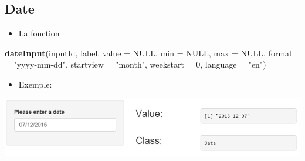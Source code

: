 \documentclass[
]{article}
\newenvironment{Shaded}{\begin{snugshade}}{\end{snugshade}}
\newcommand{\AttributeTok}[1]{\textcolor[rgb]{0.13,0.29,0.53}{#1}}
\newcommand{\CommentTok}[1]{\textcolor[rgb]{0.56,0.35,0.01}{\textit{#1}}}
\newcommand{\ConstantTok}[1]{\textcolor[rgb]{0.56,0.35,0.01}{#1}}
\newcommand{\DecValTok}[1]{\textcolor[rgb]{0.00,0.00,0.81}{#1}}
\newcommand{\FunctionTok}[1]{\textcolor[rgb]{0.13,0.29,0.53}{\textbf{#1}}}
\newcommand{\NormalTok}[1]{#1}
\newcommand{\StringTok}[1]{\textcolor[rgb]{0.31,0.60,0.02}{#1}}
\providecommand{\tightlist}{%
  \setlength{\itemsep}{0pt}\setlength{\parskip}{0pt}}
\begin{document}
\hypertarget{date}{%
\subsection{Date}\label{date}}

\begin{itemize}
\tightlist
\item
  La fonction
\end{itemize}

\begin{Shaded}
\begin{Highlighting}[]
\FunctionTok{dateInput}\NormalTok{(inputId, label, }\AttributeTok{value =} \ConstantTok{NULL}\NormalTok{, }\AttributeTok{min =} \ConstantTok{NULL}\NormalTok{, }\AttributeTok{max =} \ConstantTok{NULL}\NormalTok{, }\AttributeTok{format =} \StringTok{"yyyy{-}mm{-}dd"}\NormalTok{, }
          \AttributeTok{startview =} \StringTok{"month"}\NormalTok{, }\AttributeTok{weekstart =} \DecValTok{0}\NormalTok{, }\AttributeTok{language =} \StringTok{"en"}\NormalTok{)}
\end{Highlighting}
\end{Shaded}

\begin{itemize}
\tightlist
\item
  Exemple:
\end{itemize}

\begin{Shaded}
\end{Shaded}

\includegraphics{img/date.png}
\end{document}
